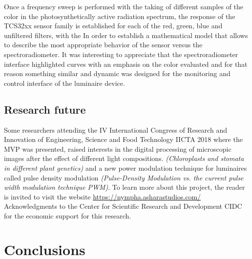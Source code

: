 \documentclass[letterpaper,12pt,twoside]{articleingud}
\begin{document}
Once a frequency sweep is performed with the taking of different samples of the color in the photosynthetically active radiation spectrum, the response of the TCS32xx sensor family is established for each of the red, green, blue and unfiltered filters, with the In order to establish a mathematical model that allows to describe the most appropriate behavior of the sensor versus the spectroradiometer.
It was interesting to appreciate that the spectroradiometer interface highlighted curves with an emphasis on the color evaluated and for that reason something similar and dynamic was designed for the monitoring and control interface of the luminaire device.
\subsection{Research future}
Some researchers attending the IV International Congress of Research and Innovation of Engineering, Science and Food Technology IICTA 2018 where the MVP was presented, raised interests in the digital processing of microscopic images after the effect of different light compositions. \textit{(Chloroplasts and stomata in different plant genetics)} and a new power modulation technique for luminaires called pulse density modulation \textit{(Pulse-Density Modulation vs. the current pulse width modulation technique PWM)}. To learn more about this project, the reader is invited to visit the website \url{https://nympha.asharastudios.com/}
Acknowledgments to the Center for Scientific Research and Development CIDC for the economic support for this research.
\section{Conclusions}
\end{document}

